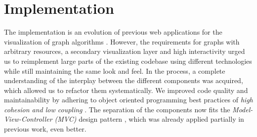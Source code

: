\chapter{Implementation}\label{ch:5}

\newenvironment{ssfont}{\fontfamily{lmss}\selectfont}{\par}

The implementation is an evolution of previous web applications for the visualization of graph algorithms \cite{storz2013idp,velden2014idp,sefidgar2015idp,becker2015idp,zoennchen2015idp}. However, the requirements for graphs with arbitrary resources, a secondary visualization layer and high interactivity urged us to reimplement large parts of the existing codebase using different technologies while still maintaining the same look and feel. In the process, a complete understanding of the interplay between the different components was acquired, which allowed us to refactor them systematically. We improved code quality and maintainability by adhering to object oriented programming best practices of \textit{high cohesion and low coupling} . The separation of the components now fits the \textit{Model-View-Controller (MVC)} design pattern , which was already applied partially in previous work, even better. 
